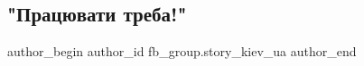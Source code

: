  
 
 
 
 

\subsection{"Працювати треба!"}
\label{sec:19_08_2023.fb.fb_group.story_kiev_ua.1.pracuvaty_treba_spogady_paton}

\ifcmt
 author_begin
   author_id fb_group.story_kiev_ua
 author_end
\fi
